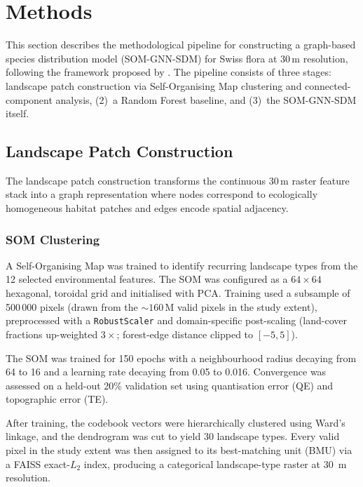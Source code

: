 \section{Methods}
\label{sec:methods}

This section describes the methodological pipeline for constructing a graph-based 
species distribution model (SOM-GNN-SDM) for Swiss flora at 30\,m resolution, 
following the framework proposed by \citet{Wu2025}. The pipeline consists of three 
stages: 
landscape patch construction via Self-Organising Map clustering and connected-
component analysis, (2)~a Random Forest baseline, and (3)~the SOM-GNN-SDM itself.

\subsection{Landscape Patch Construction}
\label{sec:patches}

The landscape patch construction transforms the continuous 30\,m raster feature 
stack into a graph representation where nodes correspond to ecologically 
homogeneous habitat patches and edges encode spatial adjacency.

\subsubsection{SOM Clustering}
\label{sec:som}

A Self-Organising Map \citep[SOM;][]{Kohonen1982} was trained to identify 
recurring landscape types from the 12 selected environmental features. The SOM 
was configured as a $64 \times 64$ hexagonal, toroidal grid and initialised with 
PCA. Training used a subsample of 500\,000 pixels (drawn from the ${\sim}160$\,M
valid pixels in the study extent), preprocessed with a \texttt{RobustScaler} and 
domain-specific post-scaling (land-cover fractions up-weighted $3\times$; 
forest-edge distance clipped to $[-5, 5]$).

The SOM was trained for 150 epochs with a neighbourhood radius decaying from 64 
to 16 and a learning rate decaying from 0.05 to 0.016. Convergence was assessed 
on a held-out 20\% validation set using quantisation error (QE) and topographic 
error (TE).

After training, the codebook vectors were hierarchically clustered using Ward's 
linkage, and the dendrogram was cut to yield 30 landscape types. Every valid 
pixel in the study extent was then assigned to its best-matching unit (BMU) via 
a FAISS exact-$L_2$ index, producing a categorical landscape-type raster at 30\,
m resolution.

